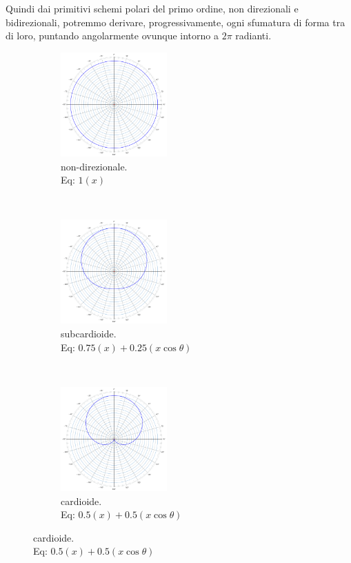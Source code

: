 Quindi dai primitivi schemi polari del primo ordine, non direzionali e
bidirezionali, potremmo derivare, progressivamente, ogni sfumatura di forma tra
di loro, puntando angolarmente ovunque intorno a $2\pi$ radianti.

\begin{figure}[h]
    \centering
    \begin{subfigure}[t]{0.3\textwidth}
        \centering
        \includegraphics[height=4cm]{CAPITOLI/_TIKZ/POLAR/omni}
        \caption{non-direzionale. \\ Eq: $1(x)$}
        \label{pol:omni-p}
    \end{subfigure}%
    ~
    \begin{subfigure}[t]{0.3\textwidth}
        \centering
        \includegraphics[height=4cm]{CAPITOLI/_TIKZ/POLAR/subcardioid}
        \caption{subcardioide. \\ Eq: $0.75(x)+0.25(x\cos\theta)$}
        \label{pol:sub-p}
    \end{subfigure}
    ~
    \begin{subfigure}[t]{0.3\textwidth}
        \centering
        \includegraphics[height=4cm]{CAPITOLI/_TIKZ/POLAR/cardioid}
        \caption{cardioide. \\ Eq: $0.5(x)+0.5(x\cos\theta)$}
        \label{pol:cardio-p}

\end{subfigure}
\end{figure}
